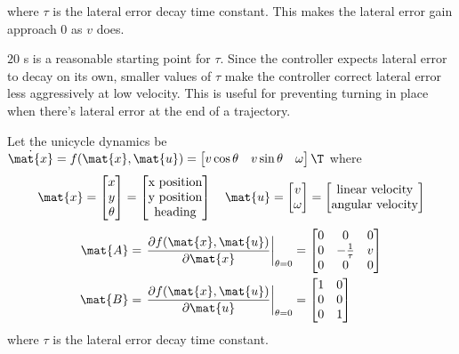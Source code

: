 where $\tau$ is the lateral error decay time constant. This makes the lateral
error gain approach $0$ as $v$ does.

$20$ s is a reasonable starting point for $\tau$. Since the controller expects
lateral error to decay on its own, smaller values of $\tau$ make the controller
correct lateral error less aggressively at low velocity. This is useful for
preventing turning in place when there's lateral error at the end of a
trajectory.
\begin{theorem}
  \label{thm:linear_time-varying_unicycle_controller}

  Let the unicycle dynamics be
  $\dot{\mat{x}} = f(\mat{x}, \mat{u}) =
  \begin{bmatrix}
    v\cos\theta &
    v\sin\theta &
    \omega
  \end{bmatrix}\T$ where
  \begin{equation*}
    \mat{x} =
    \begin{bmatrix}
      x \\
      y \\
      \theta
    \end{bmatrix} =
    \begin{bmatrix}
      \text{x position} \\
      \text{y position} \\
      \text{heading}
    \end{bmatrix}
    \quad
    \mat{u} =
    \begin{bmatrix}
      v \\
      \omega
    \end{bmatrix} =
    \begin{bmatrix}
      \text{linear velocity} \\
      \text{angular velocity}
    \end{bmatrix}
  \end{equation*}
  \begin{align*}
    \mat{A} &= \left.
      \frac{\partial f(\mat{x}, \mat{u})}{\partial\mat{x}}
    \right|_{\theta = 0} =
    \begin{bmatrix}
      0 & 0 & 0 \\
      0 & -\frac{1}{\tau} & v \\
      0 & 0 & 0
    \end{bmatrix} \\
    \mat{B} &= \left.
      \frac{\partial f(\mat{x}, \mat{u})}{\partial\mat{u}}
    \right|_{\theta = 0} =
    \begin{bmatrix}
      1 & 0 \\
      0 & 0 \\
      0 & 1
    \end{bmatrix}
  \end{align*}
  where $\tau$ is the lateral error decay time constant.


\end{theorem}
